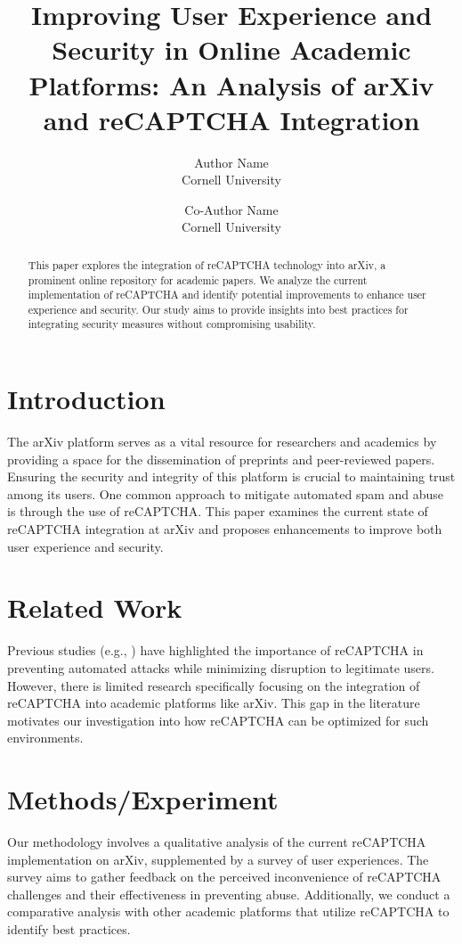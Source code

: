 \documentclass{article}
\title{Improving User Experience and Security in Online Academic Platforms: An Analysis of arXiv and reCAPTCHA Integration}
\author{Author Name\\
Cornell University\\
\and
Co-Author Name\\
Cornell University}
\date{}
\begin{document}
\maketitle

\begin{abstract}
This paper explores the integration of reCAPTCHA technology into arXiv, a prominent online repository for academic papers. We analyze the current implementation of reCAPTCHA and identify potential improvements to enhance user experience and security. Our study aims to provide insights into best practices for integrating security measures without compromising usability.
\end{abstract}

\section{Introduction}
The arXiv platform serves as a vital resource for researchers and academics by providing a space for the dissemination of preprints and peer-reviewed papers. Ensuring the security and integrity of this platform is crucial to maintaining trust among its users. One common approach to mitigate automated spam and abuse is through the use of reCAPTCHA. This paper examines the current state of reCAPTCHA integration at arXiv and proposes enhancements to improve both user experience and security.

\section{Related Work}
Previous studies (e.g., \cite{reCaptchaOverview, captchaSecurity}) have highlighted the importance of reCAPTCHA in preventing automated attacks while minimizing disruption to legitimate users. However, there is limited research specifically focusing on the integration of reCAPTCHA into academic platforms like arXiv. This gap in the literature motivates our investigation into how reCAPTCHA can be optimized for such environments.

\section{Methods/Experiment}
Our methodology involves a qualitative analysis of the current reCAPTCHA implementation on arXiv, supplemented by a survey of user experiences. The survey aims to gather feedback on the perceived inconvenience of reCAPTCHA challenges and their effectiveness in preventing abuse. Additionally, we conduct a comparative analysis with other academic platforms that utilize reCAPTCHA to identify best practices.
\end{document}
